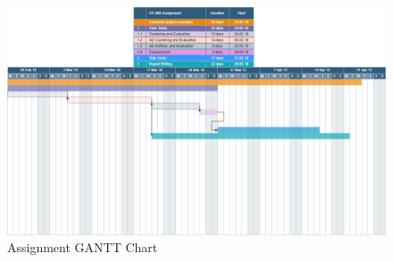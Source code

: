 \documentclass[journal]{IEEEtran}
\begin{document}
\begin{landscape}
  \begin{figure}[!h]
     \centering
      \includegraphics[width=1.25\textwidth,height=0.90\textheight]{g_chart.png}
      \caption{Assignment GANTT Chart}
      \label{fig_g_chart}
  \end{figure}
  \end{landscape}
% 




\end{document}
